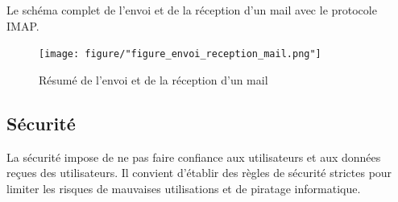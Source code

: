 \documentclass[a4paper,12pt,french]{report} %
\begin{document}
	Le schéma complet de l'envoi et de la réception d'un mail avec le protocole IMAP.
\begin{figure}[H]
\centering
\texttt{[image: figure/"figure\_envoi\_reception\_mail.png"]} 
\caption{Résumé de l'envoi et de la réception d'un mail} \label{Résumé de l'envoi et de la reception d'un mai}
\end{figure}

\subsection{Sécurité}
La sécurité impose de ne pas faire confiance aux utilisateurs et aux données reçues des utilisateurs. Il convient d'établir des règles de sécurité strictes pour limiter les risques de mauvaises utilisations et de piratage informatique.
\end{document}

